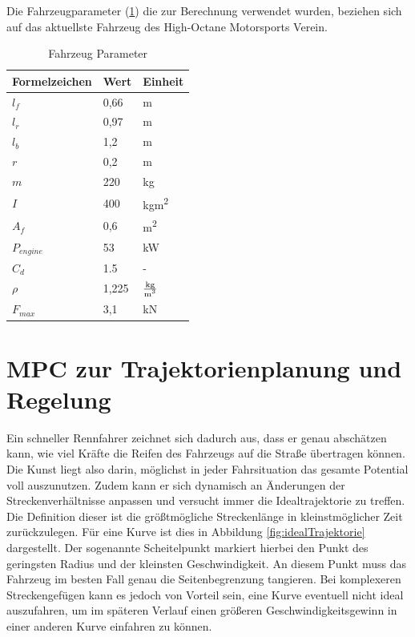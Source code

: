 \documentclass{like}
\begin{document}
Die Fahrzeugparameter (\ref{vehicleParam}) die zur Berechnung verwendet wurden, beziehen sich auf das aktuellste Fahrzeug des High-Octane Motorsports Verein.

\begin{table}[ht!]
	\centering
	\caption{Fahrzeug Parameter}
	\begin{tabular}{l|l|l}
		\hline
		Formelzeichen	& Wert & Einheit \\ \hline
		\(l_f\)	&	0,66 & m\\
		\(l_r\)	&	0,97 & m\\
		\(l_b\)	&	1,2 & m \\
		\(r\)	&	0,2 & m \\
		\(m\)	&  	220 & kg\\
		\(I\)	&  	400 & kgm\textsuperscript{2}\\
		\(A_f\)	&  	0,6 & m\textsuperscript{2}\\
		\(P_{engine}\) &  53 & kW\\
		\(C_d\)	&  	1.5 & - \\
		\(\rho\)	&  	1,225 & $\frac{\text{kg}}{\text{m\textsuperscript{3}}}$\\
		\(F_{max}\)	&  	3,1 & kN \\ 
	\end{tabular}
	\label{vehicleParam}
\end{table}



\chapter{MPC zur Trajektorienplanung und Regelung}

Ein schneller Rennfahrer zeichnet sich dadurch aus, dass er genau abschätzen kann, wie viel Kräfte die Reifen des Fahrzeugs auf die Straße übertragen können. Die Kunst liegt also darin, möglichst in jeder Fahrsituation das gesamte Potential voll auszunutzen. Zudem kann er sich dynamisch an Änderungen der Streckenverhältnisse anpassen und versucht immer die Idealtrajektorie zu treffen. Die Definition dieser ist die größtmögliche Streckenlänge in kleinstmöglicher Zeit zurückzulegen. Für eine Kurve ist dies in Abbildung \ref{fig:idealTrajektorie} dargestellt. Der sogenannte Scheitelpunkt markiert hierbei den Punkt des geringsten Radius und der kleinsten Geschwindigkeit. An diesem Punkt muss das Fahrzeug im besten Fall genau die Seitenbegrenzung tangieren. 
Bei komplexeren Streckengefügen kann es jedoch von Vorteil sein, eine Kurve eventuell nicht ideal auszufahren, um im späteren Verlauf einen größeren Geschwindigkeitsgewinn in einer anderen Kurve einfahren zu können.
\end{document}
